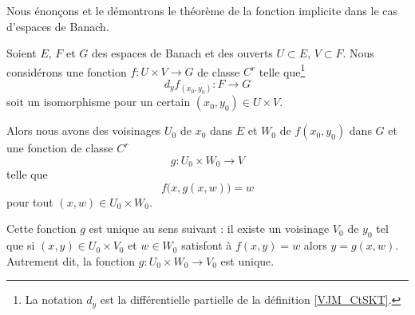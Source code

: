 Nous énonçons et le démontrons le théorème de la fonction implicite dans le cas d'espaces de Banach.
\begin{theorem} \label{ThoAcaWho}
    Soient \( E\), \( F\) et \( G\) des espaces de Banach et des ouverts \( U\subset E\), \( V\subset F\). Nous considérons une fonction \( f\colon U\times V\to G\) de classe \( C^r\) telle que\footnote{La notation \( d_y\) est la différentielle partielle de la définition \ref{VJM_CtSKT}.}
    \begin{equation}
        d_yf_{(x_0,y_0)}\colon F\to G
    \end{equation}
    soit un isomorphisme pour un certain \( (x_0,y_0)\in U\times V\).

    Alors nous avons des voisinages \( U_0\) de \( x_0\) dans \( E\) et \( W_0\) de \( f(x_0,y_0)\) dans \( G\) et une fonction de classe \( C^r\) 
    \begin{equation}
        g\colon U_0\times W_0\to V
    \end{equation}
    telle que 
    \begin{equation}
        f\big( x,g(x,w) \big)=w
    \end{equation}
    pour tout \( (x,w)\in U_0\times W_0\).
    
    Cette fonction \( g\) est unique au sens suivant : il existe un voisinage \( V_0 \) de \( y_0\) tel que si \( (x,y)\in U_0\times V_0\) et \( w\in W_0\) satisfont à \( f(x,y)=w\) alors \( y=g(x,w)\). Autrement dit, la fonction \( g\colon U_0\times W_0\to V_0\) est unique.
\end{theorem}

